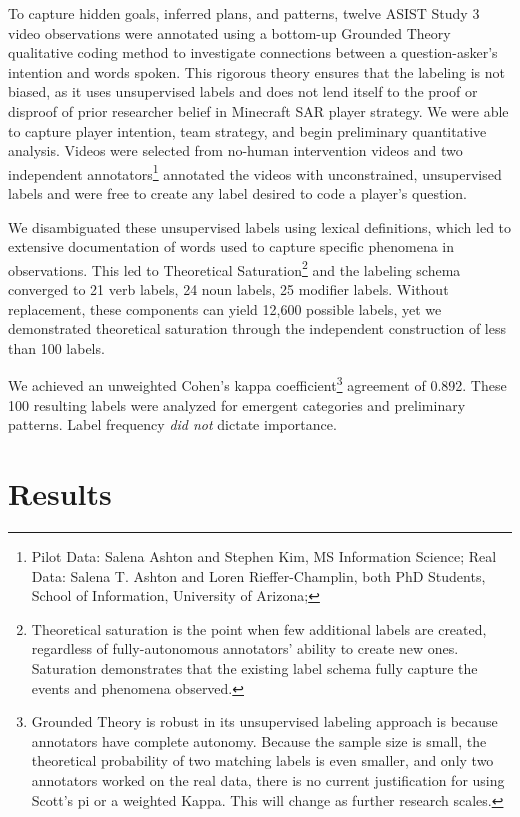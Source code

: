To capture hidden goals, inferred plans, and patterns, twelve ASIST Study 3
video observations were annotated using a
bottom-up Grounded Theory qualitative coding method to investigate connections
between a question-asker's intention and words spoken. This rigorous theory
ensures that the labeling is not biased, as it uses unsupervised labels and
does not lend itself to the proof or disproof of prior researcher belief in
Minecraft SAR player strategy.  We were able to capture player intention, team
strategy, and begin preliminary quantitative analysis. Videos were selected
from no-human intervention videos and two independent annotators\footnote{Pilot
Data: Salena Ashton and Stephen Kim, MS Information Science; Real Data: Salena
T. Ashton and Loren Rieffer-Champlin, both PhD Students, School of Information,
University of Arizona; } annotated the videos with unconstrained, unsupervised
labels and were free to create any label desired to code a player's question.

We disambiguated these unsupervised labels using lexical definitions, which led
to extensive documentation of words used to capture specific phenomena in
observations. This led to Theoretical Saturation\footnote{Theoretical
saturation is the point when few additional labels are created, regardless of
fully-autonomous annotators' ability to create new ones. Saturation
demonstrates that the existing label schema fully capture the events and
phenomena observed.} and the labeling schema converged to 21 verb labels, 24
noun labels, 25 modifier labels. Without replacement, these components can
yield 12,600 possible labels, yet we demonstrated theoretical saturation
through the independent construction of less than 100 labels.

We achieved an unweighted Cohen's kappa coefficient\footnote{Grounded Theory is robust in its
unsupervised labeling approach is because annotators have complete autonomy.
Because the sample size is small, the theoretical probability of two matching
labels is even smaller, and only two annotators worked on the real data, there
is no current justification for using Scott's pi or a weighted Kappa. This will
change as further research scales.} agreement of 0.892. These 100 resulting labels were analyzed for
emergent categories and preliminary patterns. Label frequency \emph{did not}
dictate importance.

\section{Results}

